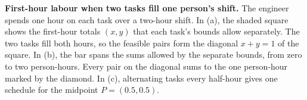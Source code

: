 \textbf{First-hour labour when two tasks fill one person's shift.}
The engineer spends one hour on each task over a two-hour shift. In (a), the shaded square shows the first-hour totals $(x,y)$ that each task's bounds allow separately. The two tasks fill both hours, so the feasible pairs form the diagonal $x+y=1$ of the square.
In (b), the bar spans the sums allowed by the separate bounds, from zero to two person-hours. Every pair on the diagonal sums to the one person-hour marked by the diamond.
In (c), alternating tasks every half-hour gives one schedule for the midpoint $P=(0.5,0.5)$.
